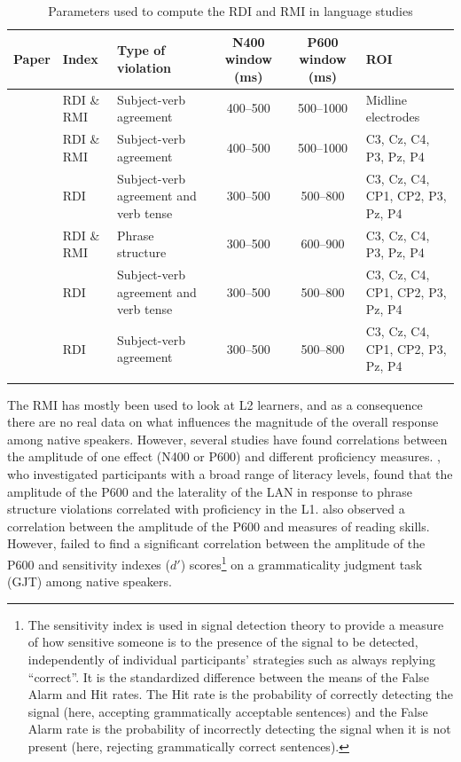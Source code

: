 \documentclass[output=paper,colorlinks,citecolor=brown,modfonts,nonflat]{../langscibook}
\begin{document}
\begin{table}
\caption{Parameters used to compute the RDI and RMI in language studies\label{bkm:Ref4494267}\label{tab:pelissier:1}}
\small
\begin{tabularx}{\textwidth}{QlQCCQ}
\lsptoprule
 Paper & Index & Type of violation & N400 window (ms) & P600 window (ms) & ROI\\
 \midrule
\citet{TannerEtAl2012} & RDI \& RMI & Subject-verb agreement & 400--500 & 500--1000 & Midline electrodes\\
\tablevspace
\citet{TannerEtAl2014} & RDI \& RMI & Subject-verb agreement & 400--500 & 500--1000 & C3, Cz, C4, P3, Pz, P4\\
\tablevspace
\citet{TannerHell2014} & RDI & Subject-verb agreement and verb tense & 300--500 & 500--800 & C3, Cz, C4, CP1, CP2, P3, Pz, P4\\
\tablevspace
\citet{Faretta-StutenbergMorgan-Short2018} & RDI \& RMI & Phrase structure & 300--500 & 600--900 & C3, Cz, C4, P3, Pz, P4\\
\tablevspace
\citet{GreyEtAl2017} & RDI & Subject-verb agreement and verb tense & 300--500 & 500--800 & C3, Cz, C4, CP1, CP2, P3, Pz, P4\\
\tablevspace
\citet{Tanner2019} & RDI & Subject-verb agreement & 300--500 & 500--800 & C3, Cz, C4, CP1, CP2, P3, Pz, P4\\
\lspbottomrule
\end{tabularx}
\end{table}

The RMI has mostly been used to look at L2 learners, and as a consequence there are no real data on what influences the magnitude of the overall response among native speakers. However, several studies have found correlations between the amplitude of one effect (N400 or P600) and different proficiency measures. \citet{PakulakNeville2010}, who investigated participants with a broad range of literacy levels, found that the amplitude of the P600 and the laterality of the LAN in response to phrase structure violations correlated with proficiency in the L1. \citet{MehravariEtAl2017} also observed a correlation between the amplitude of the P600 and measures of reading skills. However, \citet{TannerEtAl2013} failed to find a significant correlation between the amplitude of the P600 and sensitivity indexes ($d′$) scores\footnote{{The sensitivity index is used in signal detection theory to provide a measure of how sensitive someone is to the presence of the signal to be detected, independently of individual participants’ strategies such as always replying “correct”. It is the standardized difference between the means of the False Alarm and Hit rates. The Hit rate is the probability of correctly detecting the signal (here, accepting grammatically acceptable sentences) and the False Alarm rate is the probability of incorrectly detecting the signal when it is not present (here, rejecting grammatically correct sentences).} } on a grammaticality judgment task (GJT) among native speakers.
\end{document}
